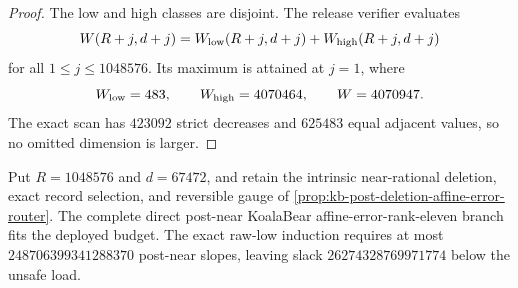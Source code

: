 \documentclass[11pt,a4paper]{amsart}
\numberwithin{equation}{section}
\theoremstyle{remark}
\begin{document}
\begin{proof}
The low and high classes are disjoint.  The release verifier evaluates
\[
 W(R+j,d+j)=W_{\rm low}(R+j,d+j)+W_{\rm high}(R+j,d+j)
\]
for all \(1\le j\le1048576\).  Its maximum is attained at \(j=1\), where
\[
 W_{\rm low}=483,\qquad W_{\rm high}=4070464,\qquad W=4070947.
\]
The exact scan has \(423092\) strict decreases and \(625483\) equal adjacent
values, so no omitted dimension is larger.
\end{proof}

\begin{corollary}
\label{cor:mca-rank-eleven-repaired}
Put \(R=1048576\) and \(d=67472\), and retain the intrinsic near-rational
deletion, exact record selection, and reversible gauge of
\cref{prop:kb-post-deletion-affine-error-router}.  The complete direct
post-near KoalaBear affine-error-rank-eleven branch fits the deployed budget.
The exact raw-low induction requires at most
\(248706399341288370\) post-near slopes, leaving slack
\(26274328769971774\) below the unsafe load.
\end{corollary}
\end{document}
